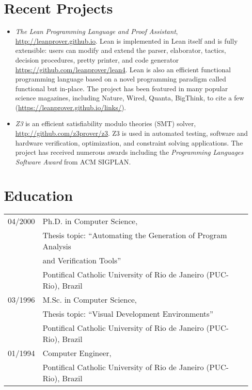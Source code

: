 \documentclass{article}
\begin{document}
\section*{Recent Projects}

\begin{itemize}
\item {\em The Lean Programming Language and Proof Assistant}, \url{http://leanprover.github.io}.
Lean is implemented in Lean itself and is fully extensible: users can modify and extend the parser, elaborator,
tactics, decision procedures, pretty printer, and code generator \url{https://github.com/leanprover/lean4}.
Lean is also an efficient functional programming language based on a novel programming paradigm called functional but in-place.
The project has been featured in many popular science magazines, including Nature, Wired, Quanta, BigThink, to cite a few (\url{https://leanprover.github.io/links/}).

\item {\em Z3} is an efficient satisfiability modulo theories (SMT) solver, \url{http://github.com/z3prover/z3}.
  Z3 is used in automated testing, software and hardware verification, optimization, and constraint solving applications.
  The project has received numerous awards including the {\em Programming Languages Software Award} from ACM SIGPLAN.
\end{itemize}

\section*{Education}
\begin{tabular}{ll}
04/2000 & Ph.D. in Computer Science, \\
  & Thesis topic: ``Automating the Generation of Program Analysis \\
  & and Verification Tools'' \\
  & Pontifical Catholic University of Rio de Janeiro (PUC-Rio), Brazil \\
03/1996 & M.Sc. in Computer Science, \\
        & Thesis topic: ``Visual Development Environments'' \\
        & Pontifical Catholic University of Rio de Janeiro (PUC-Rio), Brazil \\
01/1994 & Computer Engineer, \\
        & Pontifical Catholic University of Rio de Janeiro (PUC-Rio), Brazil \\
\end{tabular}
\end{document}
